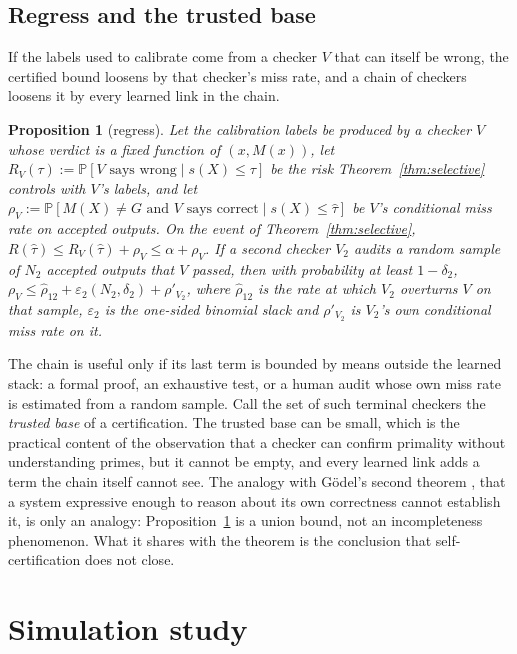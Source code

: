 \documentclass[11pt,letterpaper]{article}
\renewcommand{\Pr}{\mathbb{P}}
\newcommand{\tauhat}{\hat{\tau}}
\theoremstyle{plain}
\newtheorem{proposition}{Proposition}
\theoremstyle{definition}
\theoremstyle{remark}
\begin{document}
\subsection{Regress and the trusted base}

If the labels used to calibrate come from a checker $V$ that can itself be wrong, the certified bound loosens by that checker's miss rate, and a chain of checkers loosens it by every learned link in the chain.

\begin{proposition}[regress]
\label{prop:regress}
Let the calibration labels be produced by a checker $V$ whose verdict is a fixed function of $(x,M(x))$, let $R_V(\tau):=\Pr[V\text{ says wrong}\mid s(X)\le\tau]$ be the risk Theorem~\ref{thm:selective} controls with $V$'s labels, and let $\rho_V:=\Pr[M(X)\neq G\text{ and }V\text{ says correct}\mid s(X)\le\tauhat]$ be $V$'s conditional miss rate on accepted outputs. On the event of Theorem~\ref{thm:selective},
$R(\tauhat)\le R_V(\tauhat)+\rho_V\le\alpha+\rho_V$.
If a second checker $V_2$ audits a random sample of $N_2$ accepted outputs that $V$ passed, then with probability at least $1-\delta_2$, $\rho_V\le\hat\rho_{12}+\varepsilon_2(N_2,\delta_2)+\rho'_{V_2}$, where $\hat\rho_{12}$ is the rate at which $V_2$ overturns $V$ on that sample, $\varepsilon_2$ is the one-sided binomial slack and $\rho'_{V_2}$ is $V_2$'s own conditional miss rate on it.
\end{proposition}

The chain is useful only if its last term is bounded by means outside the learned stack: a formal proof, an exhaustive test, or a human audit whose own miss rate is estimated from a random sample. Call the set of such terminal checkers the \emph{trusted base} of a certification. The trusted base can be small, which is the practical content of the observation that a checker can confirm primality without understanding primes, but it cannot be empty, and every learned link adds a term the chain itself cannot see. The analogy with G\"odel's second theorem \citep{godel1931}, that a system expressive enough to reason about its own correctness cannot establish it, is only an analogy: Proposition~\ref{prop:regress} is a union bound, not an incompleteness phenomenon. What it shares with the theorem is the conclusion that self-certification does not close.

\section{Simulation study}
\label{sec:simulation}
\end{document}
